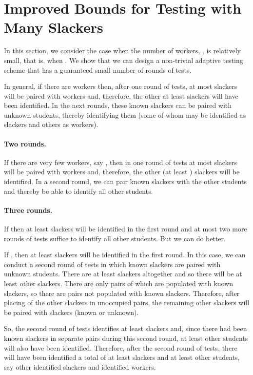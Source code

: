 \documentclass[11pt]{llncs}
\renewcommand{\subsection}[1]{\paragraph{\bf #1.}}
\begin{document}
 
\ifFull
\section{Improved Bounds for Testing with Many Slackers}
\label{sec:many}
In this section, we consider the case when the
number of workers, , is relatively
small, that is, when .
We show that we can design a
non-trivial adaptive testing 
scheme that has a guaranteed small number of rounds of tests.

In general, if there are  workers then, after one round of tests,
at most  slackers will be paired with workers and, therefore, the other
at least  slackers will have been identified.  
In the next rounds,
these known slackers can be paired with unknown students, thereby identifying them
(some of whom may be identified as slackers and others as workers).

\subsection{Two rounds}
If there are very few workers, say , then in one round of tests
at most  slackers will be paired with workers and, therefore, the other
(at least ) slackers will be identified.  In a second round, we can pair
 known slackers with the other  students and thereby be able to identify
all other students.

\subsection{Three rounds}
If  then at least  slackers will be
identified in the first round and at most two more rounds of tests suffice to
identify all other students.  But we can do better.

If , then at least  slackers will be
identified in the first round.
In this case, we can
conduct a second round of tests in which  known slackers are paired with unknown
students.
There are at least  slackers altogether
and so there will be at least  other slackers.
There are only  pairs of which  are populated with known slackers,
so there are  pairs not populated with known slackers.
Therefore, after placing  of the other slackers in unoccupied pairs,
the remaining  other slackers will be paired with slackers (known or unknown).

So, the second round of tests identifies at least  slackers and,
since there had been  known slackers in separate pairs during this second round,
at least  other students will also have been identified.
Therefore, after the second round of tests, there will have been identified
a total of at least  slackers and at least  other students,
say  other identified slackers and  identified workers.
\end{document}
